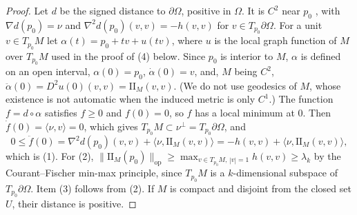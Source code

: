 \documentclass[11pt,reqno]{amsart}
\theoremstyle{definition}
\providecommand{\II}{\mathrm{I\!I}}
\newcommand{\op}{\mathrm{op}}
\numberwithin{equation}{section}
\providecommand{\II}{\mathrm{II}}
\begin{document}
\begin{proof}
Let $d$ be the signed distance to $\partial\Omega$, positive in $\Omega$. It is $C^2$ near $p_0$ \cite[Lemma~14.16]{gilbarg2001}, with $\nabla d(p_0) = \nu$ and $\nabla^2 d(p_0)(v,v) = -h(v,v)$ for $v \in T_{p_0}\partial\Omega$. For a unit $v \in T_{p_0}M$ let $\alpha(t) = p_0 + tv + u(tv)$, where $u$ is the local graph function of $M$ over $T_{p_0}M$ used in the proof of (4) below. Since $p_0$ is interior to $M$, $\alpha$ is defined on an open interval, $\alpha(0) = p_0$, $\dot\alpha(0) = v$, and, $M$ being $C^2$, $\ddot\alpha(0) = D^2u(0)(v,v) = \II_M(v,v)$. (We do not use geodesics of $M$, whose existence is not automatic when the induced metric is only $C^1$.) The function $f = d \circ \alpha$ satisfies $f \ge 0$ and $f(0) = 0$, so $f$ has a local minimum at $0$. Then $\dot f(0) = \langle \nu, v\rangle = 0$, which gives $T_{p_0}M \subset \nu^\perp = T_{p_0}\partial\Omega$, and
\begin{equation}
0 \le \ddot f(0) = \nabla^2 d(p_0)(v,v) + \langle \nu, \II_M(v,v)\rangle = -h(v,v) + \langle \nu, \II_M(v,v)\rangle,
\end{equation}
which is (1). For (2), $\|\II_M(p_0)\|_{\op} \ge \max_{v \in T_{p_0}M,\,|v|=1} h(v,v) \ge \lambda_k$ by the Courant--Fischer min-max principle, since $T_{p_0}M$ is a $k$-dimensional subspace of $T_{p_0}\partial\Omega$. Item (3) follows from (2). If $M$ is compact and disjoint from the closed set $U$, their distance is positive.


\end{proof}
\end{document}
